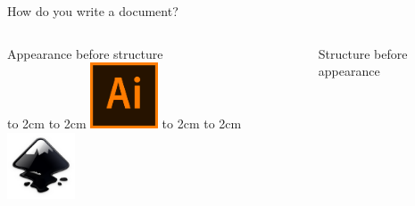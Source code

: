 \documentclass[xetex, onlymath]{beamer}
\begin{document}
\begin{frame}{How do you write a document?}
\begin{columns}
  \begin{column}{.3\linewidth}
    \begin{center}
      {\large Appearance before structure} \\
      \vspace{1cm}
      \vbox to 2cm {\vfil\hfil \hbox to 2cm {
          \includegraphics[width=2cm]{figs/illustrator-logo}
      } \hfil\vfil }
      \vspace{1cm}
      \vbox to 2cm {\vfil\hfil \hbox to 2cm {
        \includegraphics[width=2cm]{figs/inkscape-logo}
      } \hfil\vfil }
    \end{center}
  \end{column}
  \begin{column}{.3\linewidth}
  \end{column}
  \begin{column}{.3\linewidth}
    \begin{center}
      {\large Structure before appearance} \\

\end{center}
\end{column}
\end{columns}
\end{frame}
\end{document}
